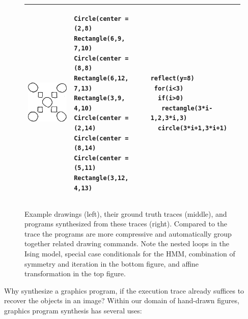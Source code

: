 \documentclass{article}
\newcommand{\remark}[1]{\textcolor{red}{[#1]}}
\begin{document}
\begin{figure}
\begin{tabular}{m{2.5cm}ll}
  \includegraphics[width = \exampleDrawingSize]{figures/expert-72-trim.png}&

\begin{minipage}{\exampleTraceSize}\begin{verbatim}
Circle(center = (2,8)
Rectangle(6,9, 7,10)
Circle(center = (8,8)
Rectangle(6,12, 7,13)
Rectangle(3,9, 4,10)
Circle(center = (2,14)
Circle(center = (8,14)
Circle(center = (5,11)
Rectangle(3,12, 4,13)
\end{verbatim}
  \end{minipage}&\begin{minipage}{\exampleProgramSize}
\begin{verbatim}
reflect(y=8)
 for(i<3)
  if(i>0)
   rectangle(3*i-1,2,3*i,3)
  circle(3*i+1,3*i+1)
\end{verbatim}
\end{minipage}\\\bottomrule
  \end{tabular}
  \caption{Example drawings (left), their ground truth traces (middle), and programs synthesized from these traces (right). Compared to the trace the programs are more compressive and automatically group together related drawing commands. Note the nested loops in the Ising model, special case conditionals for the HMM, combination of symmetry and iteration in the bottom figure, and affine transformation in the top figure.}\label{exampleSynthesisResults}
  \end{figure}

Why synthesize a graphics program,
if the execution trace already suffices to recover the objects in an image?
Within our domain of hand-drawn figures, graphics program synthesis has several uses:
\end{document}
